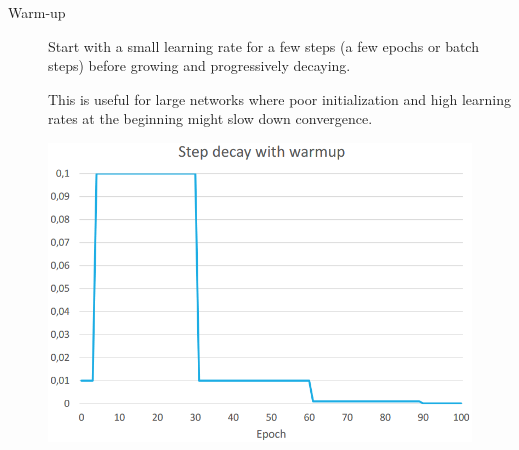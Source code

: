 \begin{minipage}{0.6\linewidth}
    \begin{description}
        \item[Warm-up]
            Start with a small learning rate for a few steps (a few epochs or batch steps) before growing and progressively decaying.

            \begin{remark}
                This is useful for large networks where poor initialization and high learning rates at the beginning might slow down convergence.
            \end{remark}
    \end{description}
\end{minipage}
\begin{minipage}{0.35\linewidth}
    \begin{figure}[H]
        \centering
        \includegraphics[width=0.9\linewidth]{./img/lr_schedule_warmup.png}
    \end{figure}
\end{minipage}


